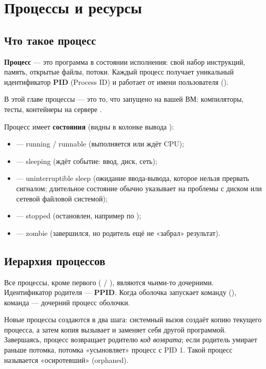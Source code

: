 \chapter{Процессы и ресурсы}
\label{ch:12-processes}

\section{Что такое процесс}

\textbf{Процесс} --- это программа в состоянии исполнения:
свой набор инструкций, память, открытые файлы, потоки.
Каждый процесс получает уникальный идентификатор \textbf{PID}
(Process ID) и работает от имени пользователя
().

В этой главе процессы --- это то, что запущено на вашей ВМ:
компиляторы, тесты, контейнеры на сервере .

Процесс имеет \textbf{состояния} (видны в колонке 
вывода ):
\begin{itemize}
  \item {} --- running / runnable (выполняется или ждёт CPU);
  \item {} --- sleeping (ждёт событие: ввод, диск, сеть);
  \item {} --- uninterruptible sleep (ожидание ввода-вывода,
    которое нельзя прервать сигналом; длительное состояние
     обычно указывает на проблемы с диском или
    сетевой файловой системой);
  \item {} --- stopped (остановлен, например по
    );
  \item {} --- zombie (завершился, но родитель ещё не
    «забрал» результат).
\end{itemize}

\section{Иерархия процессов}

Все процессы, кроме первого ( / ),
являются чьими-то дочерними. Идентификатор родителя ---
\textbf{PPID}. Когда оболочка запускает команду
(), команда --- дочерний процесс
оболочки.

Новые процессы создаются в два шага: системный вызов
 создаёт копию текущего процесса, а затем копия
вызывает  и заменяет себя другой программой.
Завершаясь, процесс возвращает родителю \emph{код возврата};
если родитель умирает раньше потомка, потомка «усыновляет»
процесс с PID 1. Такой процесс называется «осиротевший» (orphaned).

